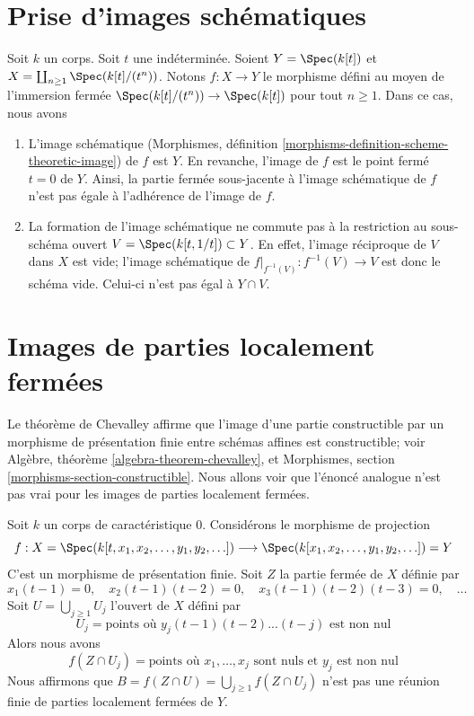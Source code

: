 \section{Prise d'images schématiques}
\label{section-scheme-theoretic-image}

\noindent
Soit $k$ un corps. Soit $t$ une indéterminée. Soient $Y = \Spec(k[t])$
et $X = \coprod_{n \geq 1} \Spec(k[t]/(t^n))$. Notons
$f : X \to Y$ le morphisme
défini au moyen de l'immersion fermée $\Spec(k[t]/(t^n)) \to \Spec(k[t])$
pour tout $n \geq 1$. Dans ce cas, nous avons
\begin{enumerate}
\item L'image schématique
(Morphismes, définition \ref{morphisms-definition-scheme-theoretic-image})
de $f$ est $Y$. En revanche, l'image de $f$ est le point fermé
$t = 0$ de $Y$. Ainsi, la partie fermée sous-jacente à
l'image schématique de $f$
n'est pas égale à l'adhérence de l'image de $f$.
\item La formation de l'image schématique ne commute pas
à la restriction au sous-schéma ouvert $V = \Spec(k[t, 1/t]) \subset Y$.
En effet, l'image réciproque de $V$ dans $X$ est vide; l'image schématique
de $f|_{f^{-1}(V)} : f^{-1}(V) \to V$ est donc le schéma vide.
Celui-ci n'est pas égal à $Y \cap V$.
\end{enumerate}




\section{Images de parties localement fermées}
\label{section-non-chevalley}

\noindent
Le théorème de Chevalley affirme que l'image d'une partie constructible
par un morphisme de présentation finie entre schémas affines est constructible; voir
Algèbre, théorème \ref{algebra-theorem-chevalley}, et
Morphismes, section \ref{morphisms-section-constructible}.
Nous allons voir que l'énoncé analogue n'est pas vrai
pour les images de parties localement fermées.

\medskip\noindent
Soit $k$ un corps de caractéristique $0$. Considérons le morphisme de projection
$$
f :
X = \Spec(k[t, x_1, x_2, \ldots, y_1, y_2, \ldots])
\longrightarrow
\Spec(k[x_1, x_2, \ldots, y_1, y_2, \ldots]) = Y
$$
C'est un morphisme de présentation finie.
Soit $Z$ la partie fermée de $X$ définie par
$$
x_1(t - 1) = 0,\quad
x_2(t - 1)(t - 2) = 0,\quad
x_3(t - 1)(t - 2)(t - 3) = 0,\quad \ldots
$$
Soit $U = \bigcup_{j \geq 1} U_j$ l'ouvert de $X$ défini par
$$
U_j = \text{points où }y_j(t - 1)(t - 2) ... (t - j)\text{ est non nul}
$$
Alors nous avons
$$
f(Z \cap U_j) =
\text{points où }x_1, \ldots, x_j\text{ sont nuls et }y_j\text{ est non nul}
$$
Nous affirmons que $B = f(Z \cap U) = \bigcup_{j \geq 1} f(Z \cap U_j)$
n'est pas une réunion finie de parties localement fermées de $Y$.

